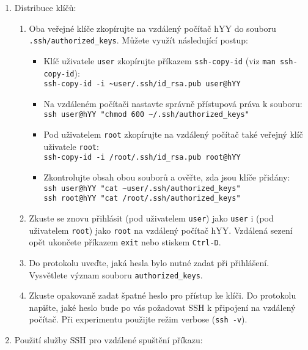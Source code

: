 \documentclass[a4paper,11pt]{article}
\begin{document}
\begin{enumerate}
  \item Distribuce klíčů:
    \begin{enumerate}
      \item Oba veřejné klíče zkopírujte na vzdálený počítač hYY do souboru \verb|.ssh/authorized_keys|. Můžete využít následující postup:
        \begin{itemize}
          \item Klíč uživatele {\tt user} zkopírujte příkazem {\tt ssh-copy-id} (viz {\tt man ssh-copy-id}): \\
            {\verb&ssh-copy-id -i ~user/.ssh/id_rsa.pub user@hYY&}
          \item Na vzdáleném počítači nastavte správně přístupová práva k souboru:\\
            {\verb&ssh user@hYY "chmod 600 ~/.ssh/authorized_keys"&} 
          \item Pod uživatelem {\tt root} zkopírujte na vzdálený počítač také veřejný klíč uživatele {\tt root}: \\
            {\verb&ssh-copy-id -i /root/.ssh/id_rsa.pub root@hYY&}
          \item Zkontrolujte obsah obou souborů a ověřte, zda jsou klíče přidány: \\
            {\verb&ssh user@hYY "cat ~user/.ssh/authorized_keys"&} \\
            {\verb&ssh root@hYY "cat /root/.ssh/authorized_keys"&}
        \end{itemize}
      \item Zkuste se znovu přihlásit (pod uživatelem {\tt user}) jako \texttt{user} i 
      (pod uživatelem {\tt root})
      jako \texttt{root} na vzdálený počítač hYY.
      Vzdálená sezení opět ukončete příkazem {\tt exit} nebo stiskem {\tt Ctrl-D}.

      \item Do protokolu uveďte, jaká hesla bylo nutné zadat při přihlášení. Vysvětlete význam souboru \texttt{authorized\_keys}.
      \item Zkuste opakovaně zadat špatné heslo pro přístup ke klíči. Do protokolu napište, jaké heslo bude po vás požadovat SSH k připojení na vzdálený počítač. Při experimentu použijte režim verbose (\texttt{ssh -v}).
    \end{enumerate}

  \item Použití služby SSH pro vzdálené spuštění příkazu:
    

\end{enumerate}
\end{document}
